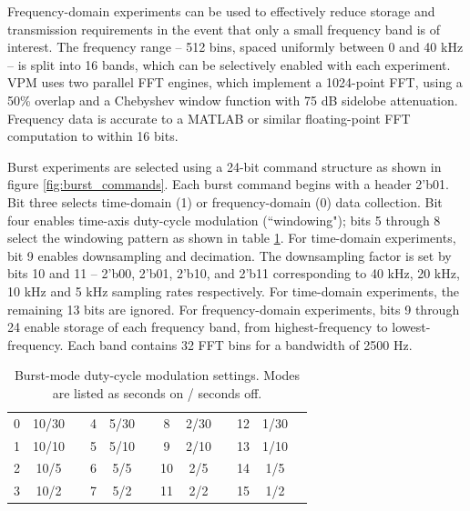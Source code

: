 Frequency-domain experiments can be used to effectively reduce storage and transmission requirements in the event that only a small frequency band is of interest. The frequency range -- 512 bins, spaced uniformly between 0 and 40 kHz -- is split into 16 bands, which can be selectively enabled with each experiment. VPM uses two parallel FFT engines, which implement a 1024-point FFT, using a 50\% overlap and a Chebyshev window function with 75 dB sidelobe attenuation. Frequency data is accurate to a MATLAB or similar floating-point FFT computation to within 16 bits. 

Burst experiments are selected using a 24-bit command structure as shown in figure \ref{fig:burst_commands}. Each burst command begins with a header 2'b01. Bit three selects time-domain (1) or frequency-domain (0) data collection. Bit four enables time-axis duty-cycle modulation (``windowing"); bits 5 through 8 select the windowing pattern as shown in table \ref{tab:windowing}. For time-domain experiments, bit 9 enables downsampling and decimation. The downsampling factor is set by bits 10 and 11 -- 2'b00, 2'b01, 2'b10, and 2'b11 corresponding to 40 kHz, 20 kHz, 10 kHz and 5 kHz sampling rates respectively. For time-domain experiments, the remaining 13 bits are ignored. For frequency-domain experiments, bits 9 through 24 enable storage of each frequency band, from highest-frequency to lowest-frequency. Each band contains 32 FFT bins for a bandwidth of 2500 Hz.


\begin{table}
\centering
\caption[Burst mode duty cycle modulation settings]{Burst-mode duty-cycle modulation settings. Modes are listed as seconds on / seconds off.}
\label{tab:windowing}
\centering
\begin{tabular}{c|ccc|ccc|ccc|cc}
 0 & 10/30 & & 4 & 5/30 & & 8 & 2/30 & & 12 & 1/30  \\
 1 & 10/10 & & 5 & 5/10 & & 9 & 2/10 & & 13 & 1/10  \\
 2 & 10/5   & & 6 & 5/5   & & 10  & 2/5   & &  14 &1/5  \\
 3 & 10/2   & & 7 & 5/2   & & 11 & 2/2   & &  15 & 1/2  \\
\end{tabular}
\end{table}


